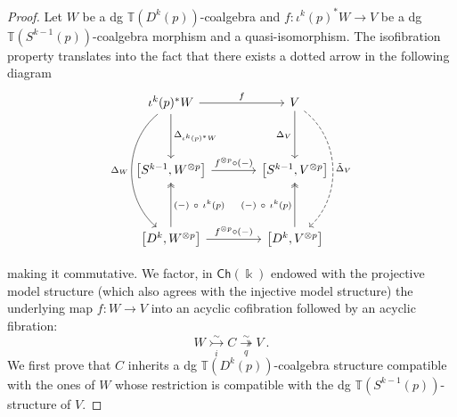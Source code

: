 \documentclass[a4paper,12pt]{amsart}
\theoremstyle{plain}
\theoremstyle{definition}
\theoremstyle{remark}
\newcommand{\kk}{\Bbbk}
\begin{document}
\begin{proof}
Let $W$ be a dg $\mathbb{T}(D^k(p))$-coalgebra and $f:\iota^k(p)^*W \longrightarrow V$ be a dg $\mathbb{T}(S^{k-1}(p))$-coalgebra morphism and a quasi-isomorphism. The isofibration property translates into the fact that there exists a dotted arrow in the following  diagram 
\[
\begin{tikzcd}[row sep=3pc, column sep=3pc]
\iota^k(p)^* W  \arrow[d, "\Delta_{\iota^k(p)^*W}"] \arrow[r, "f"] \arrow[dd, bend right=50, "\Delta_W"']
&V \arrow[d, "\Delta_V"'] \arrow[dd, bend left=50, dashed, "\tilde{\Delta}_V"]\\
\left[S^{k-1}, W^{\otimes p}\right] \arrow[r, "f^{\otimes p}\circ (-)"] 
&\left[S^{k-1}, V^{\otimes p}\right] \\
\left[D^k, W^{\otimes p}\right] \arrow[r, "f^{\otimes p}\circ (-)"] \arrow[u, two heads, "(-) ~ \circ ~ \iota^k(p)"'] 
&\left[D^k, V^{\otimes p}\right] \arrow[u, two heads, "(-) ~\circ ~\iota^k(p)"]
\end{tikzcd}
\] 

making it commutative. We factor, in $\mathsf{Ch}(\kk)$ endowed with the projective model structure (which also agrees with the injective model structure) the underlying map $f: W\rightarrow V$ into an acyclic cofibration followed by an acyclic fibration: 
    \[
    W\underset{i}{\stackrel{\sim}\rightarrowtail} C \underset{q}{\stackrel{\sim}\twoheadrightarrow} V~.
    \]
We first prove that $C$ inherits a dg $\mathbb{T}(D^k(p))$-coalgebra structure compatible with the ones of $W$ whose restriction is compatible with the dg $\mathbb{T}(S^{k-1}(p))$-structure of $V$. 


\end{proof}
\end{document}

